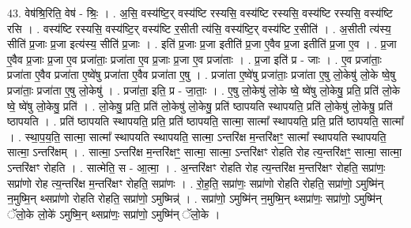 \documentclass[17pt]{extarticle}
\begin{document}
43. वेष॑श्रि॒रिति॒ वेष॑ - श्रिः॒ । . अ॒सि॒ वस्य॑ष्टि॒र् वस्य॑ष्टि रस्यसि॒ वस्य॑ष्टि रस्यसि॒ वस्य॑ष्टि रस्यसि॒ वस्य॑ष्टि रसि । . वस्य॑ष्टि रस्यसि॒ वस्य॑ष्टि॒र् वस्य॑ष्टि र॒सीती त्य॑सि॒ वस्य॑ष्टि॒र् वस्य॑ष्टि र॒सीति॑ । . अ॒सीती त्य॑स्य॒ सीति॑ प्र॒जाः प्र॒जा इत्य॑स्य॒ सीति॑ प्र॒जाः । . इति॑ प्र॒जाः प्र॒जा इतीति॑ प्र॒जा ए॒वैव प्र॒जा इतीति॑ प्र॒जा ए॒व । . प्र॒जा ए॒वैव प्र॒जाः प्र॒जा ए॒व प्रजा॑ताः॒ प्रजा॑ता ए॒व प्र॒जाः प्र॒जा ए॒व प्रजा॑ताः । . प्र॒जा इति॑ प्र - जाः । . ए॒व प्रजा॑ताः॒ प्रजा॑ता ए॒वैव प्रजा॑ता ए॒ष्वे॑षु प्रजा॑ता ए॒वैव प्रजा॑ता ए॒षु । . प्रजा॑ता ए॒ष्वे॑षु प्रजा॑ताः॒ प्रजा॑ता ए॒षु लो॒केषु॑ लो॒के ष्वे॒षु प्रजा॑ताः॒ प्रजा॑ता ए॒षु लो॒केषु॑ । . प्रजा॑ता॒ इति॒ प्र - जा॒ताः॒ । . ए॒षु लो॒केषु॑ लो॒के ष्वे॒ ष्वे॑षु लो॒केषु॒ प्रति॒ प्रति॑ लो॒के ष्वे॒ ष्वे॑षु लो॒केषु॒ प्रति॑ । . लो॒केषु॒ प्रति॒ प्रति॑ लो॒केषु॑ लो॒केषु॒ प्रति॑ ष्ठापयति स्थापयति॒ प्रति॑ लो॒केषु॑ लो॒केषु॒ प्रति॑ ष्ठापयति । . प्रति॑ ष्ठापयति स्थापयति॒ प्रति॒ प्रति॑ ष्ठापयति॒ सात्मा॒ सात्मा᳚ स्थापयति॒ प्रति॒ प्रति॑ ष्ठापयति॒ सात्मा᳚ । . स्था॒प॒य॒ति॒ सात्मा॒ सात्मा᳚ स्थापयति स्थापयति॒ सात्मा॒ ऽन्तरि॑क्ष म॒न्तरि॑क्षꣳ॒॒ सात्मा᳚ स्थापयति स्थापयति॒ सात्मा॒ ऽन्तरि॑क्षम् । . सात्मा॒ ऽन्तरि॑क्ष म॒न्तरि॑क्षꣳ॒॒ सात्मा॒ सात्मा॒ ऽन्तरि॑क्षꣳ रोहति रोह त्य॒न्तरि॑क्षꣳ॒॒ सात्मा॒ सात्मा॒ ऽन्तरि॑क्षꣳ रोहति । . सात्मेति॒ स - आ॒त्मा॒ । . अ॒न्तरि॑क्षꣳ रोहति रोह त्य॒न्तरि॑क्ष म॒न्तरि॑क्षꣳ रोहति॒ सप्रा॑णः॒ सप्रा॑णो रोह त्य॒न्तरि॑क्ष म॒न्तरि॑क्षꣳ रोहति॒ सप्रा॑णः । . रो॒ह॒ति॒ सप्रा॑णः॒ सप्रा॑णो रोहति रोहति॒ सप्रा॑णो॒ ऽमुष्मि॑न् न॒मुष्मि॒न् थ्सप्रा॑णो रोहति रोहति॒ सप्रा॑णो॒ ऽमुष्मिन्न्॑ । . सप्रा॑णो॒ ऽमुष्मि॑न् न॒मुष्मि॒न् थ्सप्रा॑णः॒ सप्रा॑णो॒ ऽमुष्मि॑न् ॅलो॒के लो॒के॑ ऽमुष्मि॒न् थ्सप्रा॑णः॒ सप्रा॑णो॒ ऽमुष्मि॑न् ॅलो॒के । \newline
\end{document}
